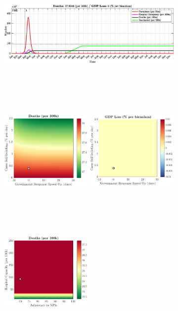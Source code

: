 \documentclass[paper=a4, fontsize=11pt]{scrartcl}
\numberwithin{figure}{section}
\numberwithin{table}{section}
\begin{document}
\begin{figure}[H]
\centering
    \begin{subfigure}[b]{\textwidth}
     	\includegraphics[width=\textwidth,height=5.5cm]{Counterfactuals/US_swfl}
    \end{subfigure}
    \begin{subfigure}[b]{\textwidth}
      	\includegraphics[width=0.49\textwidth,height=6cm]{US/SWINE/ero_d}
	\hspace{0.05cm}
    	\includegraphics[width=0.49\textwidth,height=6cm]{US/SWINE/ero_g}
    \end{subfigure}
    \begin{subfigure}[b]{\textwidth}
      	\includegraphics[width=0.49\textwidth,height=6cm]{US/SWINE/npl_d}

\end{subfigure}
\end{figure}
\end{document}
